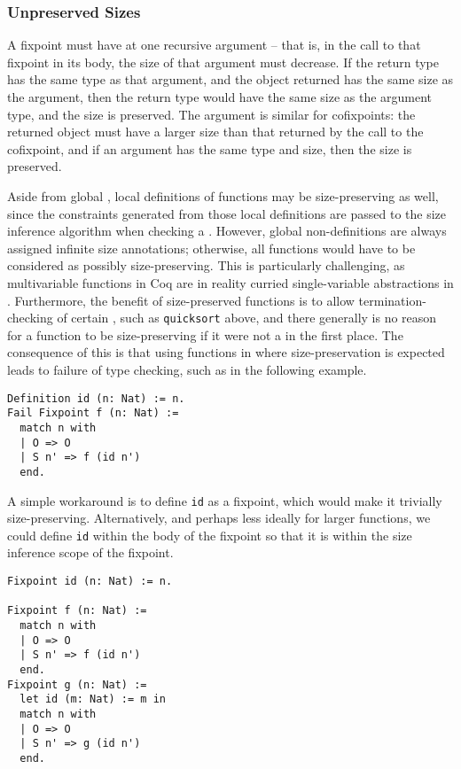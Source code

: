 \documentclass[nonacm,screen,10pt]{acmart}
\begin{document}
\subsubsection{Unpreserved Sizes}

A fixpoint must have at one recursive argument -- that is, in the call to that fixpoint in its body, the size of that argument must decrease. If the return type has the same type as that argument, and the object returned has the same size as the argument, then the return type would have the same size as the argument type, and the size is preserved. The argument is similar for cofixpoints: the returned object must have a larger size than that returned by the call to the cofixpoint, and if an argument has the same type and size, then the size is preserved.

Aside from global \cofixpoints, local definitions of functions may be size-preserving as well, since the constraints generated from those local definitions are passed to the size inference algorithm when checking a \cofixpoint. However, global non-\cofixpoint definitions are always assigned infinite size annotations; otherwise, all functions would have to be considered as possibly size-preserving. This is particularly challenging, as multivariable functions in Coq are in reality curried single-variable abstractions in \lang. Furthermore, the benefit of size-preserved functions is to allow termination-checking of certain \cofixpoints, such as \texttt{quicksort} above, and there generally is no reason for a function to be size-preserving if it were not a \cofixpoint in the first place. The consequence of this is that using functions in \cofixpoints where size-preservation is expected leads to failure of type checking, such as in the following example.

\begin{verbatim}
Definition id (n: Nat) := n.
Fail Fixpoint f (n: Nat) :=
  match n with
  | O => O
  | S n' => f (id n')
  end.
\end{verbatim}

A simple workaround is to define \texttt{id} as a fixpoint, which would make it trivially size-preserving. Alternatively, and perhaps less ideally for larger functions, we could define \texttt{id} within the body of the fixpoint so that it is within the size inference scope of the fixpoint.

\begin{verbatim}
Fixpoint id (n: Nat) := n.

Fixpoint f (n: Nat) :=
  match n with
  | O => O
  | S n' => f (id n')
  end.
Fixpoint g (n: Nat) :=
  let id (m: Nat) := m in
  match n with
  | O => O
  | S n' => g (id n')
  end.
\end{verbatim}
\end{document}
